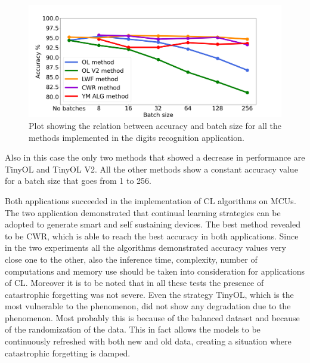 \documentclass[12pt]{report}
\newcommand\blankpage{%
    \null
    \thispagestyle{empty}%
    \addtocounter{page}{0}%
    \newpage}
\begin{document}
\begin{figure}[h!]
    \centering
    \includegraphics[width=140mm]{Figures/Chapter5/batch_size_openmv.png} 
    \caption{Plot showing the relation between accuracy and batch size for all the methods implemented in the digits recognition application.}
    \label{fig:openmv_batch_size}    
\end{figure}

Also in this case the only two methods that showed a decrease in performance are TinyOL and TinyOL V2. All the other methods show a constant accuracy value for a batch size that goes from 1 to 256.
\bigskip

Both applications succeeded in the implementation of CL algorithms on MCUs. The two application demonstrated that continual learning strategies can be adopted to generate smart and self sustaining devices. The best method revealed to be CWR, which is able to reach the best accuracy in both applications. Since in the two experiments all the algorithms demonstrated accuracy values very close one to the other, also the inference time, complexity, number of computations and memory use should be taken into consideration for applications of CL. Moreover it is to be noted that in all these tests the presence of catastrophic forgetting was not severe. Even the strategy TinyOL, which is the most vulnerable to the phenomenon, did not show any degradation due to the phenomenon. Most probably this is because of the balanced dataset and because of the randomization of the data. This in fact allows the models to be continuously refreshed with both new and old data, creating a situation where catastrophic forgetting is damped.

\afterpage{\blankpage}
\end{document}
